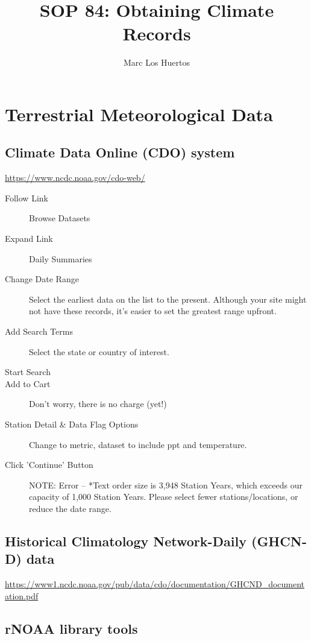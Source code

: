 \documentclass{article}\usepackage[]{graphicx}\usepackage[]{color}
\title{SOP 84: Obtaining Climate Records}
\author{Marc Los Huertos}
\begin{document}
\maketitle

\section{Terrestrial Meteorological Data}

\subsection{Climate Data Online (CDO) system}

\url{https://www.ncdc.noaa.gov/cdo-web/}

\begin{description}
  \item[Follow Link] Browse Datasets
  \item[Expand Link] Daily Summaries
  \item[Change Date Range] Select the earliest data on the list to the present. Although your site might not have these records, it's easier to set the greatest range upfront.
  \item[Add Search Terms] Select the state or country of interest.
  \item[Start Search]
  \item[Add to Cart] Don't worry, there is no charge (yet!)
  \item[Station Detail \& Data Flag Options] Change to metric, dataset to include ppt and temperature.
  \item[Click 'Continue' Button]
  
  NOTE: Error -- *Text order size is 3,948 Station Years, which exceeds our capacity of 1,000 Station Years. Please select fewer stations/locations, or reduce the date range.
\end{description}


\subsection{Historical Climatology Network-Daily (GHCN‐D) data}


\url{https://www1.ncdc.noaa.gov/pub/data/cdo/documentation/GHCND_documentation.pdf}

\subsection{rNOAA library tools}
\end{document}
